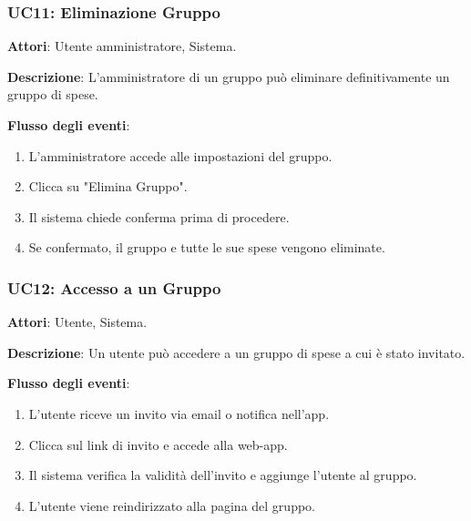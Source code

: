 \subsubsection{UC11: Eliminazione Gruppo}
\textbf{Attori}: Utente amministratore, Sistema.

\textbf{Descrizione}: L’amministratore di un gruppo può eliminare definitivamente un gruppo di spese.

\textbf{Flusso degli eventi}:
\begin{enumerate}
    \item L’amministratore accede alle impostazioni del gruppo.
    \item Clicca su "Elimina Gruppo".
    \item Il sistema chiede conferma prima di procedere.
    \item Se confermato, il gruppo e tutte le sue spese vengono eliminate.
\end{enumerate}

\subsubsection{UC12: Accesso a un Gruppo}
\textbf{Attori}: Utente, Sistema.

\textbf{Descrizione}: Un utente può accedere a un gruppo di spese a cui è stato invitato.

\textbf{Flusso degli eventi}:
\begin{enumerate}
    \item L'utente riceve un invito via email o notifica nell’app.
    \item Clicca sul link di invito e accede alla web-app.
    \item Il sistema verifica la validità dell’invito e aggiunge l’utente al gruppo.
    \item L'utente viene reindirizzato alla pagina del gruppo.
\end{enumerate}